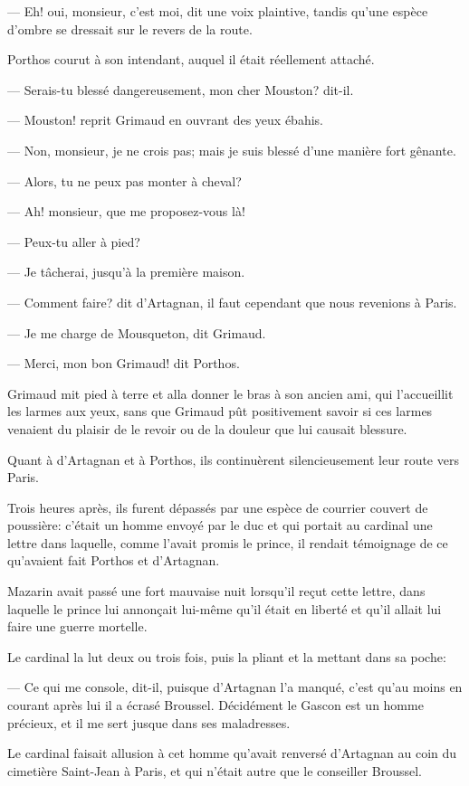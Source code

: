 — Eh! oui, monsieur, c'est moi, dit une voix plaintive, tandis qu'une espèce d'ombre se dressait sur le revers de la route.

Porthos courut à son intendant, auquel il était réellement attaché.

— Serais-tu blessé dangereusement, mon cher Mouston? dit-il.

— Mouston! reprit Grimaud en ouvrant des yeux ébahis.

— Non, monsieur, je ne crois pas; mais je suis blessé d'une manière fort gênante.

— Alors, tu ne peux pas monter à cheval?

— Ah! monsieur, que me proposez-vous là!

— Peux-tu aller à pied?

— Je tâcherai, jusqu'à la première maison.

— Comment faire? dit d'Artagnan, il faut cependant que nous revenions à Paris.

— Je me charge de Mousqueton, dit Grimaud.

— Merci, mon bon Grimaud! dit Porthos.

Grimaud mit pied à terre et alla donner le bras à son ancien ami, qui l'accueillit les larmes aux yeux, sans que Grimaud pût positivement savoir si ces larmes venaient du plaisir de le revoir ou de la douleur que lui causait blessure.

Quant à d'Artagnan et à Porthos, ils continuèrent silencieusement leur route vers Paris.

Trois heures après, ils furent dépassés par une espèce de courrier couvert de poussière: c'était un homme envoyé par le duc et qui portait au cardinal une lettre dans laquelle, comme l'avait promis le prince, il rendait témoignage de ce qu'avaient fait Porthos et d'Artagnan.

Mazarin avait passé une fort mauvaise nuit lorsqu'il reçut cette lettre, dans laquelle le prince lui annonçait lui-même qu'il était en liberté et qu'il allait lui faire une guerre mortelle.

Le cardinal la lut deux ou trois fois, puis la pliant et la mettant dans sa poche:

— Ce qui me console, dit-il, puisque d'Artagnan l'a manqué, c'est qu'au moins en courant après lui il a écrasé Broussel. Décidément le Gascon est un homme précieux, et il me sert jusque dans ses maladresses.

Le cardinal faisait allusion à cet homme qu'avait renversé d'Artagnan au coin du cimetière Saint-Jean à Paris, et qui n'était autre que le conseiller Broussel.
